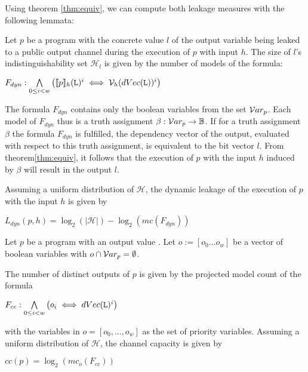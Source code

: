 Using theorem \ref{thm:equiv}, we can compute both leakage measures with the following lemmata:

\begin{lemma}
    Let $p$ be a program with the concrete value $l$ of the output variable \Out{} being leaked to a public output channel during the execution of $p$ with input $h$.
    The size of $l$'s indistinguishability set $\mathcal{H}_l$ is given by the number of models of the formula:
    \begin{center}
        $F_{dyn} : \bigwedge\limits_{0 \leq i < w} \left( \llbracket p \rrbracket_h(\mathtt{L})^i \iff \mathcal{V}_h(dVec(\mathtt{L}))^i \right)$
    \end{center}
\end{lemma}

The formula $F_{dyn}$ contains only the boolean variables from the set $\mathcal{V}ar_p$. Each model of $F_{dyn}$ thus is a truth assignment $\beta: \mathcal{V}ar_p \to \mathbb{B}$.
If for a truth assignment $\beta$ the formula $F_{dyn}$ is fulfilled, the dependency vector of the output, evaluated with respect to this truth assignment, is equivalent to the bit vector $l$. From theorem\ref{thm:equiv}, it follows that the execution of $p$ with the input $h$ induced by $\beta$ will result in the output $l$.

Assuming a uniform distribution of $\mathcal{H}$, the dynamic leakage of the execution of $p$ with the input $h$ is given by
    \begin{center}
        $L_{dyn}(p, h) = \log_2(|\mathcal{H}|) - \log_2(mc(F_{dyn}))$
    \end{center}

\begin{lemma}
    Let $p$ be a program with an output value \Out. Let $o := [o_0 ... o_w]$ be a vector of boolean variables with $o \cap \mathcal{V}ar_p = \emptyset$.
    
    The number of distinct outputs of $p$ is given by the projected model count of the formula
    \begin{center}
        $F_{cc} : \bigwedge\limits_{0 \leq i < w} \left( o_i \iff dVec(\mathtt{L})^i \right)$
    \end{center}
    with the variables in $o = [o_0, ..., o_w]$ as the set of priority variables.
    Assuming a uniform distribution of $\mathcal{H}$, the channel capacity is given by
    \begin{center}
        $cc(p) = \log_2(mc_o(F_{cc}))$
    \end{center}
\end{lemma}

